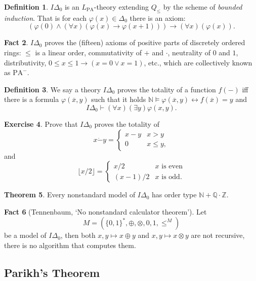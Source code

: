 \documentclass{article}
\theoremstyle{definition}
\newtheorem{thrm}{Theorem}
\newtheorem{excs}[thrm]{Exercise}
\newtheorem{fact}[thrm]{Fact}
\newtheorem{defi}[thrm]{Definition}
\newcommand{\NN}{\mathbb{N}}
\newcommand{\ZZ}{\mathbb{Z}}
\newcommand{\QQ}{\mathbb{Q}}
\newcommand{\PA}{\text{PA}}
\begin{document}
\begin{defi}
    $I\Delta_0$ is an $L_\PA$-theory extending $Q_\leq$ by the scheme of \emph{bounded induction}. That is for each $\varphi(x)\in \Delta_0$ there is an axiom:
    \[(\varphi(0) \land (\forall x)(\varphi(x)\to \varphi(x+1)))\to (\forall x)(\varphi(x)).\]
\end{defi}

\begin{fact}
    $I\Delta_0$ proves the (fifteen) axioms of positive parts of discretely ordered rings: $\leq$ is a linear order, commutativity of $+$ and $\cdot$, neutrality of $0$ and $1$, distributivity, $0 \leq x \leq 1 \to (x=0 \lor x = 1)$, etc., which are collectively known as $\PA^-$.
\end{fact}

\begin{defi}
    We say a theory $I\Delta_0$ proves the totality of a function $f(-)$ iff there is a formula $\varphi(\overline x,y)$ such that it holds $\NN \models \varphi(\overline x,y) \leftrightarrow f(\overline x)=y$ and  
    \[I\Delta_0\vdash (\forall x)(\exists y)\varphi(x,y).\]
\end{defi}

\begin{excs}
    Prove that $I\Delta_0$ proves the totality of \[x\dot - y = \begin{cases}
        x-y & x>y\\
        0 & x\leq y,
    \end{cases}\] and \[\lfloor x/2 \rfloor=
    \begin{cases}
        x/2 & x\text{ is even}\\
        (x-1)/2 & x\text{ is odd}.
    \end{cases}\]
\end{excs}

\begin{thrm}
    Every nonstandard model of $I\Delta_0$ has order type $\NN + \QQ \cdot \ZZ$.
\end{thrm}

\begin{fact}[Tennenbaum, `No nonstandard calculator theorem']
    Let \[M=(\{0,1\}^*, \oplus, \otimes,0,1, \leq^M)\] be a model of $I\Delta_0$, then both $x, y \mapsto x\oplus y$ and $x,y \mapsto x\otimes y$ are not recursive, there is no algorithm that computes them.
\end{fact}

\subsection*{Parikh's Theorem}
\end{document}
